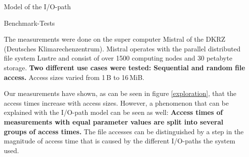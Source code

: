 \documentclass[final]{beamer}
\newlength{\onecolwid}
\begin{document}
\begin{frame}[t]
\begin{columns}[t]
\begin{column}{\onecolwid}
\begin{block}{Model of the I/O-path}
	
	
\end{block}

\begin{block}{Benchmark-Tests}
	
	The measurements were done on the super computer Mistral of the DKRZ (Deutsches Klimarechenzentrum).
	Mistral operates with the parallel distributed file system Lustre and consist of over 1500 computing nodes and 30 petabyte storage.
	\textbf{Two different use cases were tested: Sequential and random file access.}
	Access sizes varied from 1\,B to 16\,MiB.\medskip
	
	Our measurements have shown, as can be seen in figure \ref{exploration}, that the access times increase with access sizes.
	However, a phenomenon that can be explained with the I/O-path model can be seen as well: \textbf{Access times of measurements with equal parameter values are split into several groups of access times.}
	The file accesses can be distinguished by a step in the magnitude of access time that is caused by the different I/O-paths the system used.
		

\end{block}
\end{column}
\end{columns}
\end{frame}
\end{document}
